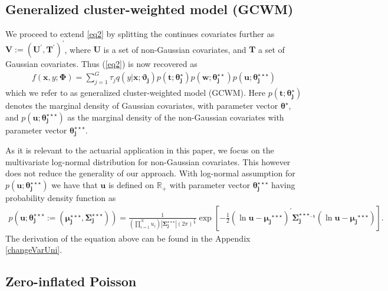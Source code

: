 \documentclass[11pt,letterpaper]{article}
\numberwithin{equation}{section}
\numberwithin{equation}{section}
\numberwithin{equation}{section}
\begin{document}
\subsection{Generalized cluster-weighted model (GCWM) }
We proceed to extend \eqref{eq2} by splitting the  continues covariates further as $\bm{V}:=(\bm U^{'}, \bm T^{'})^{'}$, where $\bm{U}$ is a set of non-Gaussian covariates, and $\bm{T}$ a set of Gaussian  covariates.  Thus (\ref{eq2}) is now recovered as
\begin{align}
 f(\bm x, y; \bm{\Phi})= \sum_{j=1}^{G} \tau_j q(y|\bm{x};\bm{\vartheta_j})p(\bm{t};\bm{\theta_j^{\star}})p(\bm{w};\bm{\theta_j^{\star\star}})p(\bm{u};\bm{\theta_j^{\star\star\star}})
\label{eq3}
\end{align}
which we refer to as generalized cluster-weighted model (GCWM). Here $p(\bm{t};\bm{\theta_j^{\star}})$ denotes the marginal density of Gaussian covariates, with parameter vector $\bm{\theta^{\star}}$, and $p(\bm{u};\bm{\theta_j^{\star\star\star}})$ as the marginal density of the non-Gaussian covariates with parameter vector $ \bm{ \theta_j^{\star\star\star}} $.


As it is relevant to the actuarial application in this paper, we focus on the multivariate log-normal distribution  for non-Gaussian covariates. This however does not reduce the generality of our approach. With log-normal assumption for $p(\bm{u};\bm{\theta_j^{\star\star\star}})$ we have that $\bm{u}$ is defined on $\mathbb{R}_+$ with parameter vector $ \bm{\theta_j^{\star\star\star}} $ having probability density function as
\begin{align} p \left(  \bm{u}; \bm{\theta_j^{\star\star\star}} := ( \bm{\mu_j^{\star\star\star}} ,\bm{ \Sigma _j^{\star\star\star }} ) \right) = \frac{1}{(\prod_{i=1}^{N}u_{i})|\bm{ \Sigma_j^{\star\star\star}} |(2 \pi)^{\frac{p}{2}}}   \exp\left[-\frac{1}{2}(\ln\bm{ u}-\bm{\mu_j}^{\star\star\star})^{'}\bm{\Sigma_j^{{\star\star\star}_{-1}}}(\ln \bm {u}-\bm{\mu_j}^{\star\star\star})\right].
\end{align} The derivation of the equation above can be found in the Appendix \ref{changeVarUni}.


\subsection{Zero-inflated Poisson}%
\end{document}
